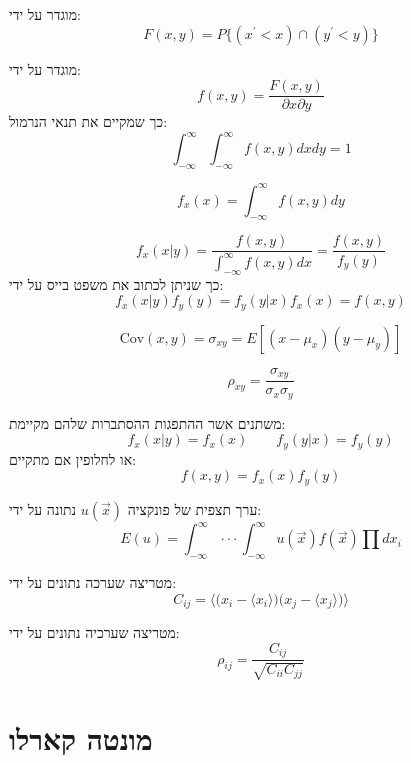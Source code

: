 \documentclass{tstextbook}
\begin{document}
\begin{definition}
מוגדר על ידי:
$$F(x,y)=P\{(x^{\prime}<x)\cap(y^{\prime}<y)\}$$

\end{definition}
\begin{definition}
מוגדר על ידי:
$$f(x,y)=\frac{F(x,y)}{\partial x\partial y}$$
כך שמקיים את תנאי הנרמול:
$$\int_{-\infty}^{\infty}\int_{-\infty}^{\infty}f(x,y)d x d y=1$$

\end{definition}
\begin{definition}
$$f_{x}(x)=\int_{-\infty}^{\infty}f(x,y)d y$$

\end{definition}
\begin{proposition}
$$f_{x}(x|y)={\frac{f(x,y)}{\int_{-\infty}^{\infty}f(x,y)d x}}={\frac{f(x,y)}{f_{y}(y)}}$$
כך שניתן לכתוב את משפט בייס על ידי:
$$f_{x}(x|y)f_{y}(y)=f_{y}(y|x)f_{x}(x)=f(x,y)$$

\end{proposition}
\begin{definition}
$$\mathrm{Cov}(x,y)=\sigma_{x y}=E[(x-\mu_{x})(y-\mu_{y})]$$

\end{definition}
\begin{definition}
$$\rho_{x y}={\frac{\sigma_{x y}}{\sigma_{x}\sigma_{y}}}$$

\end{definition}
\begin{definition}
משתנים אשר ההתפגות ההסתברות שלהם מקיימת:
$$f_{x}(x|y)=f_{x}(x)\qquad f_{y}(y|x)=f_{y}(y)$$
או לחלופין אם מתקיים:
$$f(x,y)=f_{x}(x)f_{y}(y)$$

\end{definition}
\begin{proposition}
ערך תצפית של פונקציה \(u\left( \vec{x} \right)\) נתונה על ידי:
$$E(u)=\int_{-\infty}^{\infty}\cdot\cdot\cdot\int_{-\infty}^{\infty}u(\vec{x})f(\vec{x})\prod d x_{i}$$

\end{proposition}
\begin{definition}
מטריצה שערכה נתונים על ידי:
$$C_{i j}=\langle{\big(}x_{i}-\langle x_{i}\rangle{\big)}{\big(}x_{j}-\langle x_{j}\rangle{\big)}\rangle$$

\end{definition}
\begin{definition}
מטריצה שערכיה נתונים על ידי:
$$\rho_{i j}={\frac{C_{i j}}{\sqrt{C_{i i}C_{j j}}}}$$

\end{definition}
\section{מונטה קארלו}
\end{document}
